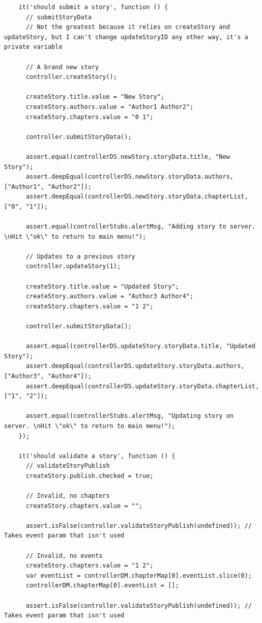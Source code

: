 \documentclass[12pt]{ucthesis}
\begin{document}
\begin{lstlisting}
    it('should submit a story', function () {
      // submitStoryData
      // Not the greatest because it relies on createStory and updateStory, but I can't change updateStoryID any other way, it's a private variable

      // A brand new story
      controller.createStory();

      createStory.title.value = "New Story";
      createStory.authors.value = "Author1 Author2";
      createStory.chapters.value = "0 1";

      controller.submitStoryData();

      assert.equal(controllerDS.newStory.storyData.title, "New Story");
      assert.deepEqual(controllerDS.newStory.storyData.authors, ["Author1", "Author2"]);
      assert.deepEqual(controllerDS.newStory.storyData.chapterList, ["0", "1"]);

      assert.equal(controllerStubs.alertMsg, "Adding story to server. \nHit \"ok\" to return to main menu!");

      // Updates to a previous story
      controller.updateStory(1);

      createStory.title.value = "Updated Story";
      createStory.authors.value = "Author3 Author4";
      createStory.chapters.value = "1 2"; 

      controller.submitStoryData();

      assert.equal(controllerDS.updateStory.storyData.title, "Updated Story");
      assert.deepEqual(controllerDS.updateStory.storyData.authors, ["Author3", "Author4"]);
      assert.deepEqual(controllerDS.updateStory.storyData.chapterList, ["1", "2"]);

      assert.equal(controllerStubs.alertMsg, "Updating story on server. \nHit \"ok\" to return to main menu!");
    });

    it('should validate a story', function () {
      // validateStoryPublish
      createStory.publish.checked = true;

      // Invalid, no chapters
      createStory.chapters.value = "";

      assert.isFalse(controller.validateStoryPublish(undefined)); // Takes event param that isn't used

      // Invalid, no events
      createStory.chapters.value = "1 2";
      var eventList = controllerDM.chapterMap[0].eventList.slice(0);
      controllerDM.chapterMap[0].eventList = [];

      assert.isFalse(controller.validateStoryPublish(undefined)); // Takes event param that isn't used


\end{lstlisting}
\end{document}
